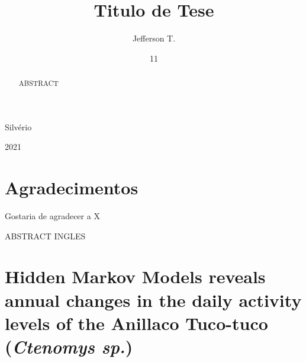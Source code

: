 \documentclass[english,msc,numbers,hidelinks]{coppe}
\begin{document}
  \title{Titulo de Tese}
    \author{Jefferson T.}{Silvério}
  

  \date{11}{2021}
    
  \maketitle

  \frontmatter
  
  \dedication{``O sol afundou mais um pouco. As sombras se alongaram, atravessando a caldeira de sal. Linhas de cores vibrantes espalharam-se sobre o horizonte do poente. A cor foi se transformando num dedo de trevas a experimentar a areia. As sombras cor de carvão se alastraram, e o desmoronamento compacto da noite obliterou o deserto.'' \linebreak \textnormal{— Frank Herbert, Dune.}}
  
    \chapter*{Agradecimentos}
  Gostaria de agradecer a X
  
  \begin{abstract}
  ABSTRACT
  \end{abstract}
  \pagebreak
  \begin{foreignabstract}
  ABSTRACT INGLES
  \end{foreignabstract}
  \tableofcontents
  
    \listoffigures
  
    \listoftables
  
  \printlosymbols
  \printloabbreviations

  \mainmatter
  \hypertarget{hidden-markov-models-reveals-annual-changes-in-the-daily-activity-levels-of-the-anillaco-tuco-tuco-ctenomys-sp.}{%
  \chapter{\texorpdfstring{Hidden Markov Models reveals annual changes in the daily activity levels of the Anillaco Tuco-tuco (\emph{Ctenomys sp.})}{Hidden Markov Models reveals annual changes in the daily activity levels of the Anillaco Tuco-tuco (Ctenomys sp.)}}\label{hidden-markov-models-reveals-annual-changes-in-the-daily-activity-levels-of-the-anillaco-tuco-tuco-ctenomys-sp.}}
\end{document}
